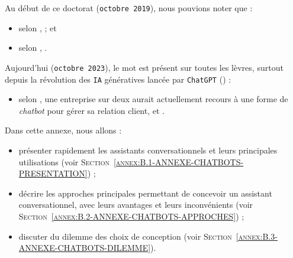 \DontFrameThisInToc
{}
\label{annex:B-ANNEXE-CHATBOTS}
	
	
	Au début de ce doctorat (\texttt{octobre 2019}), nous pouvions noter que :
	\begin{itemize}
		\item selon \cite{costello-lodolce:2019:gartner-top-technologies},  ; et
		\item selon \cite{goasduff:2019:chatbots-will-appeal}, .
	\end{itemize}
	
	Aujourd'hui (\texttt{octobre 2023}), le mot  est présent sur toutes les lèvres, surtout depuis la révolution des \texttt{IA} génératives lancée par \texttt{ChatGPT} (\cite{openai:2023:chatgpt}) :
	\begin{itemize}
		\item selon \cite{costello-lodolce:2022:gartner-predicts-chatbots}, une entreprise sur deux aurait actuellement recours à une forme de \textit{chatbot} pour gérer sa relation client, et .
	\end{itemize}

	Dans cette annexe, nous allons :
	\begin{itemize}
		\item présenter rapidement les assistants conversationnels et leurs principales utilisations (voir \textsc{Section~\ref{annex:B.1-ANNEXE-CHATBOTS-PRESENTATION}}) ;
		\item décrire les approches principales permettant de concevoir un assistant conversationnel, avec leurs avantages et leurs inconvénients (voir \textsc{Section~\ref{annex:B.2-ANNEXE-CHATBOTS-APPROCHES}}) ;
		\item discuter du dilemme des choix de conception (voir \textsc{Section~\ref{annex:B.3-ANNEXE-CHATBOTS-DILEMME}}).
	\end{itemize}
	
